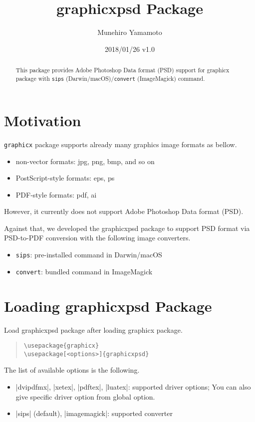 \documentclass[luatex]{article}
\title{\textsf{graphicxpsd} Package}
\author{Munehiro Yamamoto}
\date{2018/01/26 v1.0}
\begin{document}
\maketitle
\begin{abstract}
This package provides Adobe Photoshop Data format (PSD) support 
for \textsf{graphicx} package
with \texttt{sips} (Darwin/macOS)/\texttt{convert} (ImageMagick) command.
\end{abstract}

\section{Motivation}
\texttt{graphicx} package supports already many graphics image formats as bellow. 
\begin{itemize}
\item non-vector formats: jpg, png, bmp, and so on
\item PostScript-style formats: eps, ps
\item PDF-style formats: pdf, ai
\end{itemize}
However, it currently does not support Adobe Photoshop Data format (PSD). 

Against that, we developed the \textsf{graphicxpsd} package 
to support PSD format via PSD-to-PDF conversion 
with the following image converters.
\begin{itemize}
\item \texttt{sips}: pre-installed command in Darwin/macOS
\item \texttt{convert}: bundled command in ImageMagick
\end{itemize}

\section{Loading \textsf{graphicxpsd} Package}

Load \textsf{graphicxpsd} package after loading \textsf{graphicx} package.

\begin{quote}
\begin{verbatim}
\usepackage{graphicx}
\usepackage[<options>]{graphicxpsd}
\end{verbatim}
\end{quote}

The list of available options is the following.
\begin{itemize}
\item |dvipdfmx|, |xetex|, |pdftex|, |luatex|: supported driver options; 
You can also give specific driver option from global option.

\item |sips| (default), |imagemagick|: supported converter
\end{itemize}
\end{document}

